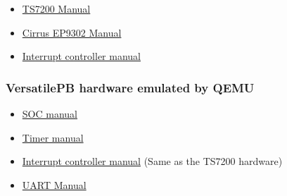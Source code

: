 \begin{itemize}
\itemsep1pt\parskip0pt
\item
  \href{http://www.cgl.uwaterloo.ca/~wmcowan/teaching/cs452/pdf/ts-7200-manual.pdf}{TS7200
  Manual}
\item
  \href{http://www.cgl.uwaterloo.ca/~wmcowan/teaching/cs452/pdf/ep93xx-user-guide.pdf}{Cirrus
  EP9302 Manual}
\item
  \href{http://www.cgl.uwaterloo.ca/~wmcowan/teaching/cs452/pdf/icu-pl190.pdf}{Interrupt
  controller manual}
\end{itemize}

\subsubsection{VersatilePB hardware emulated by
QEMU}\label{versatilepb-hardware-emulated-by-qemu}

\begin{itemize}
\itemsep1pt\parskip0pt
\item
  \href{http://infocenter.arm.com/help/topic/com.arm.doc.dui0224i/DUI0224I_realview_platform_baseboard_for_arm926ej_s_ug.pdf}{SOC
  manual}
\item
  \href{http://infocenter.arm.com/help/topic/com.arm.doc.ddi0271d/DDI0271.pdf}{Timer
  manual}
\item
  \href{http://infocenter.arm.com/help/topic/com.arm.doc.ddi0181e/DDI0181.pdf}{Interrupt
  controller manual} (Same as the TS7200 hardware)
\item
  \href{http://infocenter.arm.com/help/topic/com.arm.doc.ddi0183f/DDI0183.pdf}{UART
  Manual}
\end{itemize}
